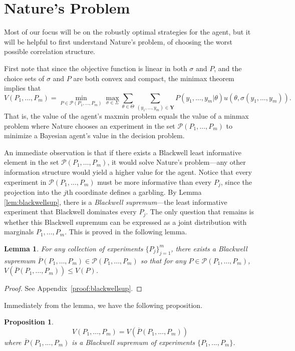 \documentclass[11pt]{article}
\theoremstyle{plain}
\newtheorem{lem}{Lemma}
\newtheorem{prop}{Proposition}
\theoremstyle{remark}
\begin{document}
\section{Nature's Problem}

Most of our focus will be on the robustly optimal strategies for the agent, but it will be helpful to first understand Nature's problem, of choosing the worst possible correlation structure. 

First note that since the objective function is linear in both $\sigma$ and $P$, and the choice sets of $\sigma$ and $P$ are both convex and compact, the minimax theorem implies that
	\[
	V(P_1, \ldots , P_m)= \min_{P \in \mathcal{P}(P_1, \ldots , P_m)} \max_{\sigma\in\Sigma}  \sum_{\theta\in\Theta}\sum_{(y_1, \ldots , y_m) \in \mathbf{Y}} P(y_1, \ldots , y_m|\theta)  u(\theta,\sigma(y_1, \ldots , y_m)).
	\]
That is, the value of the agent's maxmin problem equals the value of a minmax problem where Nature chooses an experiment in the set $\mathcal{P}(P_1, \ldots , P_m)$ to minimize a Bayesian agent's value in the decision problem. 

An immediate observation is that if there exists a Blackwell least informative element in the set $\mathcal{P}(P_1, \ldots , P_m)$, it would solve Nature's problem---any other information structure would yield a higher value for the agent. Notice that every experiment in $\mathcal{P}(P_1, \ldots , P_m)$ must be more informative than every $P_j$, since the projection into the $j$th coordinate defines a garbling. By Lemma \ref{lem:blackwellsup}, there is a \emph{Blackwell supremum}---the least informative experiment that Blackwell dominates every $P_j$. The only question that remains is whether this Blackwell supremum can be expressed as a joint distribution with marginals $P_1,\ldots, P_m$. This is proved in the following lemma.

\begin{lem}\label{lem:supjoint}
For any collection of experiments $\{P_j\}_{j=1}^m$, there exists a Blackwell supremum $\overline{P}(P_1,\ldots,P_m)\in \mathcal{P}(P_1, \ldots , P_m)$ so that for any $P\in \mathcal{P}(P_1, \ldots , P_m)$, $V(\overline{P}(P_1,\ldots,P_m))\leq V(P)$.

\end{lem}
\begin{proof}
See Appendix~\ref{proof:blackwellsup}.
\end{proof}

Immediately from the lemma, we have the following proposition.
\begin{prop}\label{value}
    $$V(P_1,...,P_m)=V(\overline{P}(P_1,...,P_m))$$
    where $\overline{P}(P_1,...,P_m)$ is a Blackwell supremum of experiments $\{P_1,...,P_m\}$.
\end{prop}
\end{document}
